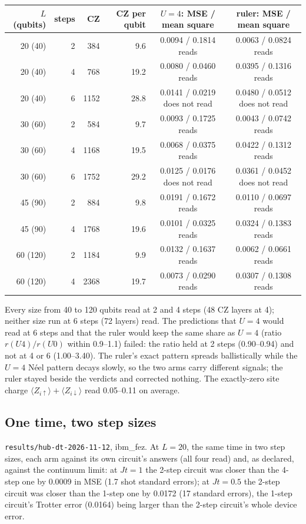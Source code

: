 \documentclass[10pt,a4paper]{article}
\begin{document}
\begin{center}\small
\begin{tabular}{rrrrcc}
\toprule
$L$ (qubits) & steps & CZ & CZ per qubit & $U=4$: MSE / mean square & ruler: MSE / mean square \\
\midrule
20 (40) & 2 & 384 & 9.6 & 0.0094 / 0.1814 reads & 0.0063 / 0.0824 reads \\
20 (40) & 4 & 768 & 19.2 & 0.0080 / 0.0460 reads & 0.0395 / 0.1316 reads \\
20 (40) & 6 & 1152 & 28.8 & 0.0141 / 0.0219 does not read & 0.0480 / 0.0512 does not read \\
30 (60) & 2 & 584 & 9.7 & 0.0093 / 0.1725 reads & 0.0043 / 0.0742 reads \\
30 (60) & 4 & 1168 & 19.5 & 0.0068 / 0.0375 reads & 0.0422 / 0.1312 reads \\
30 (60) & 6 & 1752 & 29.2 & 0.0125 / 0.0176 does not read & 0.0361 / 0.0452 does not read \\
45 (90) & 2 & 884 & 9.8 & 0.0191 / 0.1672 reads & 0.0110 / 0.0697 reads \\
45 (90) & 4 & 1768 & 19.6 & 0.0101 / 0.0325 reads & 0.0324 / 0.1383 reads \\
60 (120) & 2 & 1184 & 9.9 & 0.0132 / 0.1637 reads & 0.0062 / 0.0661 reads \\
60 (120) & 4 & 2368 & 19.7 & 0.0073 / 0.0290 reads & 0.0307 / 0.1308 reads \\
\bottomrule
\end{tabular}
\end{center}

Every size from 40 to 120 qubits read at 2 and 4 steps (48 CZ layers at 4); neither size run at 6 steps (72 layers)
read. The predictions that $U = 4$ would read at 6 steps and that the ruler would keep the same share as $U = 4$ (ratio
$r(U4)/r(U0)$ within 0.9--1.1) failed: the ratio held at 2 steps (0.90--0.94) and not at 4 or 6 (1.00--3.40). The
ruler's exact pattern spreads ballistically while the $U = 4$ N\'eel pattern decays slowly, so the two arms carry
different signals; the ruler stayed beside the verdicts and corrected nothing. The exactly-zero site charge
$\langle Z_{i\uparrow}\rangle + \langle Z_{i\downarrow}\rangle$ read 0.05--0.11 on average.

\subsection{One time, two step sizes}
\texttt{results/hub-dt-2026-11-12}, ibm\_fez. At $L = 20$, the same time in two step sizes, each arm against its own
circuit's answers (all four read) and, as declared, against the continuum limit: at $Jt = 1$ the 2-step circuit was
closer than the 4-step one by 0.0009 in MSE (1.7 shot standard errors); at $Jt = 0.5$ the 2-step circuit was closer
than the 1-step one by 0.0172 (17 standard errors), the 1-step circuit's Trotter error (0.0164) being larger than the
2-step circuit's whole device error.
\end{document}
